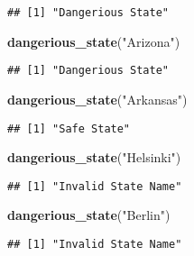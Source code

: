 \documentclass[
]{article}
\newenvironment{Shaded}{\begin{snugshade}}{\end{snugshade}}
\newcommand{\KeywordTok}[1]{\textcolor[rgb]{0.13,0.29,0.53}{\textbf{#1}}}
\newcommand{\NormalTok}[1]{#1}
\newcommand{\StringTok}[1]{\textcolor[rgb]{0.31,0.60,0.02}{#1}}
\begin{document}
\begin{verbatim}
## [1] "Dangerious State"
\end{verbatim}

\begin{Shaded}
\begin{Highlighting}[]
\KeywordTok{dangerious_state}\NormalTok{(}\StringTok{"Arizona"}\NormalTok{)}
\end{Highlighting}
\end{Shaded}

\begin{verbatim}
## [1] "Dangerious State"
\end{verbatim}

\begin{Shaded}
\begin{Highlighting}[]
\KeywordTok{dangerious_state}\NormalTok{(}\StringTok{"Arkansas"}\NormalTok{)}
\end{Highlighting}
\end{Shaded}

\begin{verbatim}
## [1] "Safe State"
\end{verbatim}

\begin{Shaded}
\begin{Highlighting}[]
\KeywordTok{dangerious_state}\NormalTok{(}\StringTok{"Helsinki"}\NormalTok{)}
\end{Highlighting}
\end{Shaded}

\begin{verbatim}
## [1] "Invalid State Name"
\end{verbatim}

\begin{Shaded}
\begin{Highlighting}[]
\KeywordTok{dangerious_state}\NormalTok{(}\StringTok{"Berlin"}\NormalTok{)}
\end{Highlighting}
\end{Shaded}

\begin{verbatim}
## [1] "Invalid State Name"
\end{verbatim}
\end{document}
